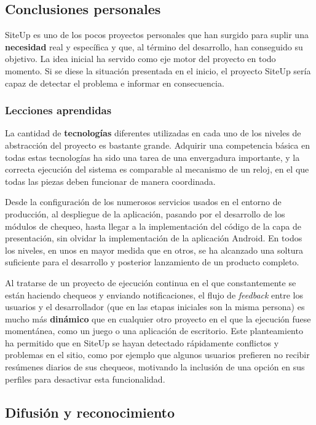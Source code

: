 \documentclass[a4paper,12pt]{article}
\begin{document}
\subsection{Conclusiones personales}

SiteUp es uno de los pocos proyectos personales que han surgido para suplir una
\textbf{necesidad} real y específica y que, al término del desarrollo, han
conseguido su objetivo. La idea inicial ha servido como eje motor del proyecto
en todo momento. Si se diese la situación presentada en el inicio, el proyecto
SiteUp sería capaz de detectar el problema e informar en consecuencia.


\subsubsection{Lecciones aprendidas}

La cantidad de \textbf{tecnologías} diferentes utilizadas en cada uno de los
niveles de abstracción del proyecto es bastante grande. Adquirir una competencia
básica en todas estas tecnologías ha sido una tarea de una envergadura
importante, y la correcta ejecución del sistema es comparable al mecanismo de un
reloj, en el que todas las piezas deben funcionar de manera coordinada.

Desde la configuración de los numerosos servicios usados en el entorno de
producción, al despliegue de la aplicación, pasando por el desarrollo de los
módulos de chequeo, hasta llegar a la implementación del código de la capa de
presentación, sin olvidar la implementación de la aplicación Android. En todos
los niveles, en unos en mayor medida que en otros, se ha alcanzado una soltura
suficiente para el desarrollo y posterior lanzamiento de un producto completo.

Al tratarse de un proyecto de ejecución continua en el que constantemente se
están haciendo chequeos y enviando notificaciones, el flujo de \textit{feedback}
entre los usuarios y el desarrollador (que en las etapas iniciales son la misma
persona) es mucho más \textbf{dinámico} que en cualquier otro proyecto en el que
la ejecución fuese momentánea, como un juego o una aplicación de
escritorio. Este planteamiento ha permitido que en SiteUp se hayan detectado
rápidamente conflictos y problemas en el sitio, como por ejemplo que algunos
usuarios prefieren no recibir resúmenes diarios de sus chequeos, motivando la
inclusión de una opción en sus perfiles para desactivar esta funcionalidad.

\subsection{Difusión y reconocimiento}
\end{document}
